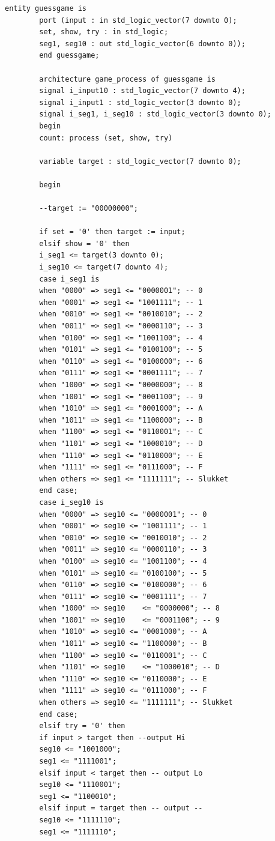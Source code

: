\begin{enumerate}
\begin{lstlisting}[caption={Behavioral style kode for Guessgame},label={lst:Guessgame}]
		entity guessgame is 
		port (input : in std_logic_vector(7 downto 0);
		set, show, try : in std_logic;
		seg1, seg10 : out std_logic_vector(6 downto 0));
		end guessgame;
		
		architecture game_process of guessgame is
		signal i_input10 : std_logic_vector(7 downto 4);
		signal i_input1 : std_logic_vector(3 downto 0);
		signal i_seg1, i_seg10 : std_logic_vector(3 downto 0);
		begin
		count: process (set, show, try)
		
		variable target : std_logic_vector(7 downto 0);
		
		begin
		
		--target := "00000000";
		
		if set = '0' then target := input;
		elsif show = '0' then 
		i_seg1 <= target(3 downto 0);
		i_seg10 <= target(7 downto 4);
		case i_seg1 is
		when "0000" => seg1 <= "0000001"; -- 0
		when "0001" => seg1 <= "1001111"; -- 1
		when "0010" => seg1 <= "0010010"; -- 2
		when "0011" => seg1 <= "0000110"; -- 3
		when "0100" => seg1 <= "1001100"; -- 4
		when "0101" => seg1 <= "0100100"; -- 5
		when "0110" => seg1 <= "0100000"; -- 6
		when "0111" => seg1 <= "0001111"; -- 7
		when "1000" => seg1 <= "0000000"; -- 8
		when "1001" => seg1 <= "0001100"; -- 9
		when "1010" => seg1 <= "0001000"; -- A
		when "1011" => seg1 <= "1100000"; -- B
		when "1100" => seg1 <= "0110001"; -- C
		when "1101" => seg1 <= "1000010"; -- D
		when "1110" => seg1 <= "0110000"; -- E
		when "1111" => seg1 <= "0111000"; -- F
		when others => seg1 <= "1111111"; -- Slukket
		end case;
		case i_seg10 is
		when "0000" => seg10 <= "0000001"; -- 0
		when "0001" => seg10 <= "1001111"; -- 1
		when "0010" => seg10 <= "0010010"; -- 2
		when "0011" => seg10 <= "0000110"; -- 3
		when "0100" => seg10 <= "1001100"; -- 4
		when "0101" => seg10 <= "0100100"; -- 5
		when "0110" => seg10 <= "0100000"; -- 6
		when "0111" => seg10 <= "0001111"; -- 7
		when "1000" => seg10	<= "0000000"; -- 8
		when "1001" => seg10	<= "0001100"; -- 9
		when "1010" => seg10 <= "0001000"; -- A
		when "1011" => seg10 <= "1100000"; -- B
		when "1100" => seg10 <= "0110001"; -- C
		when "1101" => seg10	<= "1000010"; -- D
		when "1110" => seg10 <= "0110000"; -- E
		when "1111" => seg10 <= "0111000"; -- F
		when others => seg10 <= "1111111"; -- Slukket
		end case;
		elsif try = '0' then 
		if input > target then --output Hi
		seg10 <= "1001000"; 
		seg1 <= "1111001";
		elsif input < target then -- output Lo
		seg10 <= "1110001"; 
		seg1 <= "1100010";
		elsif input = target then -- output --
		seg10 <= "1111110"; 
		seg1 <= "1111110";

\end{lstlisting}
\end{enumerate}
